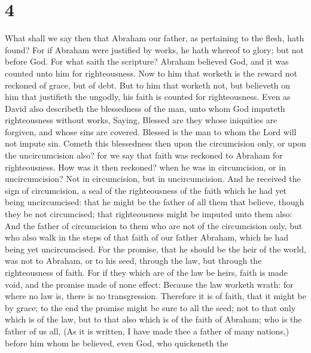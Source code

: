 \hypertarget{section-3}{%
\section{4}\label{section-3}}

 What shall we say then that Abraham our father, as
pertaining to the flesh, hath found?  For if Abraham were
justified by works, he hath whereof to glory; but not before God.
 For what saith the scripture? Abraham believed God, and
it was counted unto him for righteousness.  Now to him
that worketh is the reward not reckoned of grace, but of debt.
 But to him that worketh not, but believeth on him that
justifieth the ungodly, his faith is counted for righteousness.
 Even as David also describeth the blessedness of the man,
unto whom God imputeth righteousness without works, 
Saying, Blessed are they whose iniquities are forgiven, and whose sins
are covered.  Blessed is the man to whom the Lord will not
impute sin.  Cometh this blessedness then upon the
circumcision only, or upon the uncircumcision also? for we say that
faith was reckoned to Abraham for righteousness.  How was
it then reckoned? when he was in circumcision, or in uncircumcision? Not
in circumcision, but in uncircumcision.  And he received
the sign of circumcision, a seal of the righteousness of the faith which
he had yet being uncircumcised: that he might be the father of all them
that believe, though they be not circumcised; that righteousness might
be imputed unto them also:  And the father of
circumcision to them who are not of the circumcision only, but who also
walk in the steps of that faith of our father Abraham, which he had
being yet uncircumcised.  For the promise, that he should
be the heir of the world, was not to Abraham, or to his seed, through
the law, but through the righteousness of faith.  For if
they which are of the law be heirs, faith is made void, and the promise
made of none effect:  Because the law worketh wrath: for
where no law is, there is no transgression.  Therefore it
is of faith, that it might be by grace; to the end the promise might be
sure to all the seed; not to that only which is of the law, but to that
also which is of the faith of Abraham; who is the father of us all,
 (As it is written, I have made thee a father of many
nations,) before him whom he believed, even God, who quickeneth the
